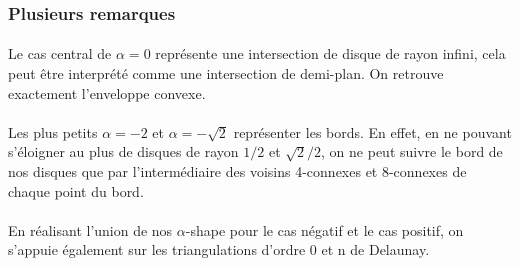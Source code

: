 
\subsubsection{Plusieurs remarques}

\paragraph{}
Le cas central de $\alpha = 0$ représente une intersection de disque de rayon infini, cela peut être interprété comme une intersection de demi-plan. On retrouve exactement l'enveloppe convexe.

\paragraph{}
Les plus petits $\alpha = -2$ et $\alpha = -\sqrt{2}$ représenter les bords. En effet, en ne pouvant s'éloigner au plus de disques de rayon $1/2$ et $\sqrt{2}/2$, on ne peut suivre le bord de nos disques que par l'intermédiaire des voisins 4-connexes et 8-connexes de chaque point du bord.

\paragraph{}
En réalisant l'union de nos $\alpha$-shape pour le cas négatif et le cas positif, on s'appuie également sur les triangulations d'ordre 0 et n de Delaunay. 
